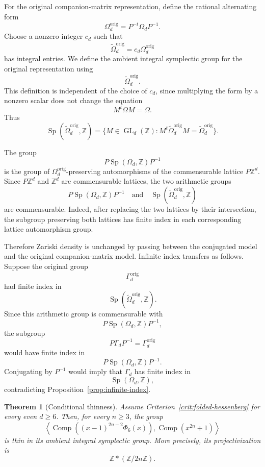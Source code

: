 \documentclass[a4paper,11pt]{amsart}
\newcommand{\Z}{\mathbb Z}
\newcommand{\Comp}{\operatorname{Comp}}
\newcommand{\Sp}{\operatorname{Sp}}
\newcommand{\GL}{\operatorname{GL}}
\newtheorem{theorem}{Theorem}[section]
\theoremstyle{remark}
\numberwithin{equation}{section}
\begin{document}
For the original companion-matrix representation, define the rational alternating form
\begin{equation}\label{eq:Omega-orig}
\Omega_d^{\mathrm{orig}}
=
P^{-t}\Omega_dP^{-1}.
\end{equation}
Choose a nonzero integer \(c_d\) such that
\begin{equation}\label{eq:Omega-orig-integral}
\widetilde\Omega_d^{\mathrm{orig}}
=
c_d\Omega_d^{\mathrm{orig}}
\end{equation}
has integral entries. We define the ambient integral symplectic group for the original representation using
\[
\widetilde\Omega_d^{\mathrm{orig}}.
\]
This definition is independent of the choice of \(c_d\), since multiplying the form by a nonzero scalar does not change the equation
\[
M^t\Omega M=\Omega.
\]
Thus
\[
\Sp(\widetilde\Omega_d^{\mathrm{orig}},\Z)
=
\{M\in\GL_d(\Z):M^t\widetilde\Omega_d^{\mathrm{orig}}M
=\widetilde\Omega_d^{\mathrm{orig}}\}.
\]

The group
\[
P\Sp(\Omega_d,\Z)P^{-1}
\]
is the group of \(\Omega_d^{\mathrm{orig}}\)-preserving automorphisms of the commensurable lattice \(P\Z^d\). Since \(P\Z^d\) and \(\Z^d\) are commensurable lattices, the two arithmetic groups
\[
P\Sp(\Omega_d,\Z)P^{-1}
\quad\text{and}\quad
\Sp(\widetilde\Omega_d^{\mathrm{orig}},\Z)
\]
are commensurable. Indeed, after replacing the two lattices by their intersection, the subgroup preserving both lattices has finite index in each corresponding lattice automorphism group.

Therefore Zariski density is unchanged by passing between the conjugated model and the original companion-matrix model. Infinite index transfers as follows. Suppose the original group
\[
\Gamma_d^{\mathrm{orig}}
\]
had finite index in
\[
\Sp(\widetilde\Omega_d^{\mathrm{orig}},\Z).
\]
Since this arithmetic group is commensurable with
\[
P\Sp(\Omega_d,\Z)P^{-1},
\]
the subgroup
\[
P\Gamma_dP^{-1}=\Gamma_d^{\mathrm{orig}}
\]
would have finite index in
\[
P\Sp(\Omega_d,\Z)P^{-1}.
\]
Conjugating by \(P^{-1}\) would imply that \(\Gamma_d\) has finite index in
\[
\Sp(\Omega_d,\Z),
\]
contradicting Proposition~\ref{prop:infinite-index}.

\begin{theorem}[Conditional thinness]\label{thm:conditional-thinness}
Assume Criterion~\ref{crit:folded-hessenberg} for every even \(d\geq6\). Then, for every \(n\geq3\), the group
\[
\left\langle
\Comp\!\left((x-1)^{2n-2}\Phi_6(x)\right),
\Comp(x^{2n}+1)
\right\rangle
\]
is thin in its ambient integral symplectic group. More precisely, its projectivization is
\[
\Z*(\Z/2n\Z).
\]
\end{theorem}
\end{document}
